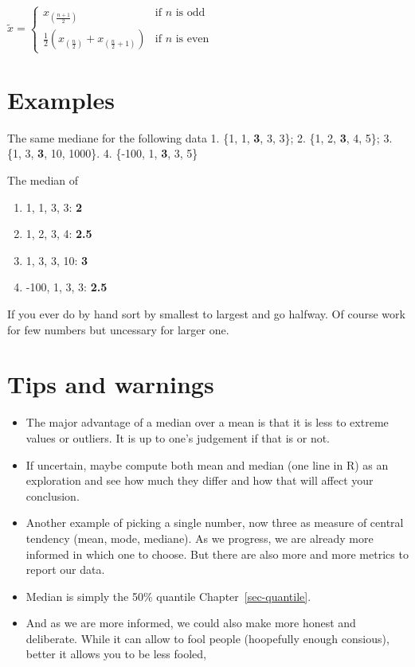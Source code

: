 \documentclass[
  letterpaper,
  DIV=11,
  numbers=noendperiod]{scrreprt}
\providecommand{\tightlist}{%
  \setlength{\itemsep}{0pt}\setlength{\parskip}{0pt}}
\begin{document}
\(\tilde{x} = \begin{cases} x_{\left(\frac{n+1}{2}\right)} & \text{if } n \text{ is odd} \\ \frac{1}{2}\left(x_{\left(\frac{n}{2}\right)} + x_{\left(\frac{n}{2}+1\right)}\right) & \text{if } n \text{ is even} \end{cases}\)

\section*{Examples}\label{examples-22}


The same mediane for the following data 1. \{1, 1, \textbf{3}, 3, 3\};
2. \{1, 2, \textbf{3}, 4, 5\}; 3. \{1, 3, \textbf{3}, 10, 1000\}. 4.
\{-100, 1, \textbf{3}, 3, 5\}

The median of

\begin{enumerate}
\def\labelenumi{\arabic{enumi}.}
\tightlist
\item
  1, 1, 3, 3: \textbf{2}
\item
  1, 2, 3, 4: \textbf{2.5}
\item
  1, 3, 3, 10: \textbf{3}
\item
  -100, 1, 3, 3: \textbf{2.5}
\end{enumerate}

If you ever do by hand sort by smallest to largest and go halfway. Of
course work for few numbers but uncessary for larger one.

\section*{Tips and warnings}\label{tips-and-warnings-16}


\begin{itemize}
\tightlist
\item
  The major advantage of a median over a mean is that it is less to
  extreme values or outliers. It is up to one's judgement if that is or
  not.
\item
  If uncertain, maybe compute both mean and median (one line in R) as an
  exploration and see how much they differ and how that will affect your
  conclusion.
\item
  Another example of picking a single number, now three as measure of
  central tendency (mean, mode, mediane). As we progress, we are already
  more informed in which one to choose. But there are also more and more
  metrics to report our data.
\item
  Median is simply the 50\% quantile Chapter~\ref{sec-quantile}.
\item
  And as we are more informed, we could also make more honest and
  deliberate. While it can allow to fool people (hoopefully enough
  consious), better it allows you to be less fooled,
\end{itemize}
\end{document}
